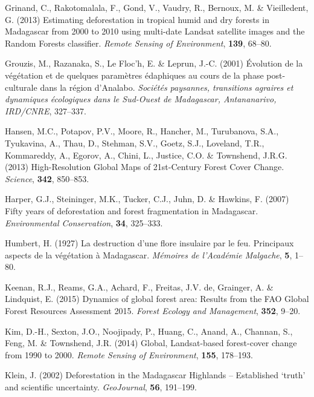\documentclass[]{article}
\theoremstyle{definition}
\theoremstyle{definition}
\theoremstyle{definition}
\theoremstyle{remark}
\begin{document}
\leavevmode\hypertarget{ref-Grinand2013}{}%
Grinand, C., Rakotomalala, F., Gond, V., Vaudry, R., Bernoux, M. \&
Vieilledent, G. (2013) Estimating deforestation in tropical humid and
dry forests in Madagascar from 2000 to 2010 using multi-date Landsat
satellite images and the Random Forests classifier. \emph{Remote Sensing
of Environment}, \textbf{139}, 68--80.

\leavevmode\hypertarget{ref-Grouzis2001}{}%
Grouzis, M., Razanaka, S., Le Floc'h, E. \& Leprun, J.-C. (2001)
Évolution de la végétation et de quelques paramètres édaphiques au cours
de la phase post-culturale dans la région d'Analabo. \emph{Sociétés
paysannes, transitions agraires et dynamiques écologiques dans le
Sud-Ouest de Madagascar, Antananarivo, IRD/CNRE}, 327--337.

\leavevmode\hypertarget{ref-Hansen2013}{}%
Hansen, M.C., Potapov, P.V., Moore, R., Hancher, M., Turubanova, S.A.,
Tyukavina, A., Thau, D., Stehman, S.V., Goetz, S.J., Loveland, T.R.,
Kommareddy, A., Egorov, A., Chini, L., Justice, C.O. \& Townshend,
J.R.G. (2013) High-Resolution Global Maps of 21st-Century Forest Cover
Change. \emph{Science}, \textbf{342}, 850--853.

\leavevmode\hypertarget{ref-Harper2007}{}%
Harper, G.J., Steininger, M.K., Tucker, C.J., Juhn, D. \& Hawkins, F.
(2007) Fifty years of deforestation and forest fragmentation in
Madagascar. \emph{Environmental Conservation}, \textbf{34}, 325--333.

\leavevmode\hypertarget{ref-Humbert1927}{}%
Humbert, H. (1927) La destruction d'une flore insulaire par le feu.
Principaux aspects de la végétation à Madagascar. \emph{Mémoires de
l'Académie Malgache}, \textbf{5}, 1--80.

\leavevmode\hypertarget{ref-Keenan2015}{}%
Keenan, R.J., Reams, G.A., Achard, F., Freitas, J.V. de, Grainger, A. \&
Lindquist, E. (2015) Dynamics of global forest area: Results from the
FAO Global Forest Resources Assessment 2015. \emph{Forest Ecology and
Management}, \textbf{352}, 9--20.

\leavevmode\hypertarget{ref-Kim2014}{}%
Kim, D.-H., Sexton, J.O., Noojipady, P., Huang, C., Anand, A., Channan,
S., Feng, M. \& Townshend, J.R. (2014) Global, Landsat-based
forest-cover change from 1990 to 2000. \emph{Remote Sensing of
Environment}, \textbf{155}, 178--193.

\leavevmode\hypertarget{ref-Klein2002}{}%
Klein, J. (2002) Deforestation in the Madagascar Highlands --
Established `truth' and scientific uncertainty. \emph{GeoJournal},
\textbf{56}, 191--199.
\end{document}
